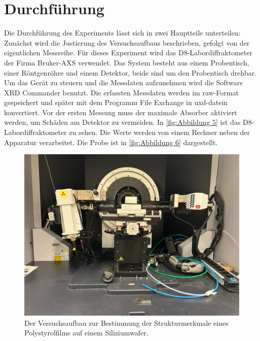 \section{Durchführung}
\label{sec:Durchführung}
Die Durchführung des Experiments lässt sich in zwei Hauptteile unterteilen: Zunächst wird die Justierung des Versuchsaufbaus
beschrieben, gefolgt von der eigentlichen Messreihe. Für dieses Experiment wird das D8-Labordiffraktometer der Firma Bruker-AXS verwendet.
Das System besteht aus einem Probentisch, einer Röntgenröhre und einem Detektor, beide sind um den Probentisch drehbar. Um das
Gerät zu steuern und die Messdaten aufzunehmen wird die Software XRD Commander benutzt. Die erfassten Messdaten werden im 
raw-Format gespeichert und später mit dem Programm File Exchange in uxd-datein konvertiert. Vor der ersten Messung muss der maximale Absorber 
aktiviert werden, um Schäden am Detektor zu vermeiden.
In \autoref{fig:Abbildung 5} ist das D8-Labordiffraktometer zu sehen. Die Werte werden von einem
Rechner neben der Apparatur verarbeitet. Die Probe ist in \autoref{fig:Abbildung 6} dargestellt.

\begin{figure}[H]
    \includegraphics[width=\textwidth]{bilder/aufbau.jpeg}
    \caption{Der Versuchsaufbau zur Bestimmung der Strukturmerkmale
    eines Polystyrolfilms auf einem Siliziumwafer.}
    \label{fig:Abbildung 5}
\end{figure}


